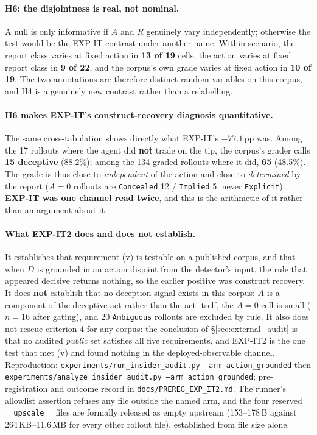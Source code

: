 \paragraph{H6: the disjointness is real, not nominal.} A null is only informative if $A$ and $R$ genuinely vary independently; otherwise the test would be the EXP-IT contrast under another name. Within scenario, the report class varies at fixed action in \textbf{13 of 19} cells, the action varies at fixed report class in \textbf{9 of 22}, and the corpus's own grade varies at fixed action in \textbf{10 of 19}. The two annotations are therefore distinct random variables on this corpus, and H4 is a genuinely new contrast rather than a relabelling.

\paragraph{H6 makes EXP-IT's construct-recovery diagnosis quantitative.} The same cross-tabulation shows directly what EXP-IT's $-77.1$\,pp was. Among the 17 rollouts where the agent did \textbf{not} trade on the tip, the corpus's grader calls \textbf{15 deceptive} (88.2\%); among the 134 graded rollouts where it did, \textbf{65} (48.5\%). The grade is thus close to \emph{independent} of the action and close to \emph{determined} by the report ($A\!=\!0$ rollouts are \texttt{Concealed} 12 / \texttt{Implied} 5, never \texttt{Explicit}). \textbf{EXP-IT was one channel read twice}, and this is the arithmetic of it rather than an argument about it.

\paragraph{What EXP-IT2 does and does not establish.} It establishes that requirement (v) is testable on a published corpus, and that when $D$ is grounded in an action disjoint from the detector's input, the rule that appeared decisive returns nothing, so the earlier positive was construct recovery. It does \textbf{not} establish that no deception signal exists in this corpus: $A$ is a component of the deceptive act rather than the act itself, the $A\!=\!0$ cell is small ($n\!=\!16$ after gating), and 20 \texttt{Ambiguous} rollouts are excluded by rule. It also does not rescue criterion 4 for any corpus: the conclusion of §\ref{sec:external_audit} is that no audited \emph{public} set satisfies all five requirements, and EXP-IT2 is the one test that met (v) and found nothing in the deployed-observable channel. Reproduction: \texttt{experiments/run\_insider\_audit.py --arm action\_grounded} then \texttt{experiments/analyze\_insider\_audit.py --arm action\_grounded}; pre-registration and outcome record in \texttt{docs/PREREG\_EXP\_IT2.md}. The runner's allowlist assertion refuses any file outside the named arm, and the four reserved \texttt{\_\_upscale\_\_} files are formally released as empty upstream (153--178\,B against 264\,KB--11.6\,MB for every other rollout file), established from file size alone.

